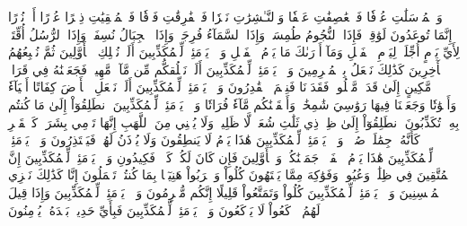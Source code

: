 وَٱلۡمُرۡسَلَٰتِ عُرۡفٗا
فَٱلۡعَٰصِفَٰتِ عَصۡفٗا
وَٱلنَّـٰشِرَٰتِ نَشۡرٗا
فَٱلۡفَٰرِقَٰتِ فَرۡقٗا
فَٱلۡمُلۡقِيَٰتِ ذِكۡرًا
عُذۡرًا أَوۡ نُذۡرًا
إِنَّمَا تُوعَدُونَ لَوَٰقِعٞ
فَإِذَا ٱلنُّجُومُ طُمِسَتۡ
وَإِذَا ٱلسَّمَآءُ فُرِجَتۡ
وَإِذَا ٱلۡجِبَالُ نُسِفَتۡ
وَإِذَا ٱلرُّسُلُ أُقِّتَتۡ
لِأَيِّ يَوۡمٍ أُجِّلَتۡ
لِيَوۡمِ ٱلۡفَصۡلِ
وَمَآ أَدۡرَىٰكَ مَا يَوۡمُ ٱلۡفَصۡلِ
وَيۡلٞ يَوۡمَئِذٖ لِّلۡمُكَذِّبِينَ
أَلَمۡ نُهۡلِكِ ٱلۡأَوَّلِينَ
ثُمَّ نُتۡبِعُهُمُ ٱلۡأٓخِرِينَ
كَذَٰلِكَ نَفۡعَلُ بِٱلۡمُجۡرِمِينَ
وَيۡلٞ يَوۡمَئِذٖ لِّلۡمُكَذِّبِينَ
أَلَمۡ نَخۡلُقكُّم مِّن مَّآءٖ مَّهِينٖ
فَجَعَلۡنَٰهُ فِي قَرَارٖ مَّكِينٍ
إِلَىٰ قَدَرٖ مَّعۡلُومٖ
فَقَدَرۡنَا فَنِعۡمَ ٱلۡقَٰدِرُونَ
وَيۡلٞ يَوۡمَئِذٖ لِّلۡمُكَذِّبِينَ
أَلَمۡ نَجۡعَلِ ٱلۡأَرۡضَ كِفَاتًا
أَحۡيَآءٗ وَأَمۡوَٰتٗا
وَجَعَلۡنَا فِيهَا رَوَٰسِيَ شَٰمِخَٰتٖ وَأَسۡقَيۡنَٰكُم مَّآءٗ فُرَاتٗا
وَيۡلٞ يَوۡمَئِذٖ لِّلۡمُكَذِّبِينَ
ٱنطَلِقُوٓاْ إِلَىٰ مَا كُنتُم بِهِۦ تُكَذِّبُونَ
ٱنطَلِقُوٓاْ إِلَىٰ ظِلّٖ ذِي ثَلَٰثِ شُعَبٖ
لَّا ظَلِيلٖ وَلَا يُغۡنِي مِنَ ٱللَّهَبِ
إِنَّهَا تَرۡمِي بِشَرَرٖ كَٱلۡقَصۡرِ
كَأَنَّهُۥ جِمَٰلَتٞ صُفۡرٞ
وَيۡلٞ يَوۡمَئِذٖ لِّلۡمُكَذِّبِينَ
هَٰذَا يَوۡمُ لَا يَنطِقُونَ
وَلَا يُؤۡذَنُ لَهُمۡ فَيَعۡتَذِرُونَ
وَيۡلٞ يَوۡمَئِذٖ لِّلۡمُكَذِّبِينَ
هَٰذَا يَوۡمُ ٱلۡفَصۡلِۖ جَمَعۡنَٰكُمۡ وَٱلۡأَوَّلِينَ
فَإِن كَانَ لَكُمۡ كَيۡدٞ فَكِيدُونِ
وَيۡلٞ يَوۡمَئِذٖ لِّلۡمُكَذِّبِينَ
إِنَّ ٱلۡمُتَّقِينَ فِي ظِلَٰلٖ وَعُيُونٖ
وَفَوَٰكِهَ مِمَّا يَشۡتَهُونَ
كُلُواْ وَٱشۡرَبُواْ هَنِيٓـَٔۢا بِمَا كُنتُمۡ تَعۡمَلُونَ
إِنَّا كَذَٰلِكَ نَجۡزِي ٱلۡمُحۡسِنِينَ
وَيۡلٞ يَوۡمَئِذٖ لِّلۡمُكَذِّبِينَ
كُلُواْ وَتَمَتَّعُواْ قَلِيلًا إِنَّكُم مُّجۡرِمُونَ
وَيۡلٞ يَوۡمَئِذٖ لِّلۡمُكَذِّبِينَ
وَإِذَا قِيلَ لَهُمُ ٱرۡكَعُواْ لَا يَرۡكَعُونَ
وَيۡلٞ يَوۡمَئِذٖ لِّلۡمُكَذِّبِينَ
فَبِأَيِّ حَدِيثِۭ بَعۡدَهُۥ يُؤۡمِنُونَ